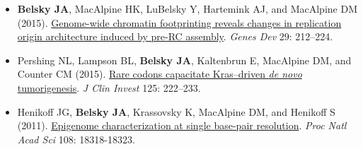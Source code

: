 
\vspace{-2mm}
\begin{resentries}

\begin{itemize}[leftmargin=!, labelindent=5pt, itemindent=-15pt, nosep]
	\setlength{\itemsep}{2pt}
	\item{\textbf{Belsky JA}, MacAlpine HK, LuBelsky Y, Hartemink AJ, and MacAlpine DM (2015).  \href{http://dx.doi.org/10.1101/gad.247924.114}{\color{blue} Genome-wide chromatin footprinting reveals changes in replication origin architecture induced by pre-RC assembly}.  \textit{Genes Dev} 29: 212--224.}
	\item{Pershing NL, Lampson BL, \textbf{Belsky JA}, Kaltenbrun E, MacAlpine DM, and Counter CM (2015).  \href{http://dx.doi.org/10.1172/JCI77627}{\color{blue} Rare codons capacitate Kras--driven \textit{de novo} tumorigenesis}.  \textit{J Clin Invest} 125: 222--233.}
	\item{Henikoff JG, \textbf{Belsky JA}, Krassovsky K, MacAlpine DM, and Henikoff S (2011).  \href{http://dx.doi.org/10.1073/pnas.1110731108}{\color{blue} Epigenome characterization at single base-pair resolution}.  \textit{Proc Natl Acad Sci} 108: 18318-18323.}

\end{itemize}

\end{resentries}
\vspace{-1mm}
